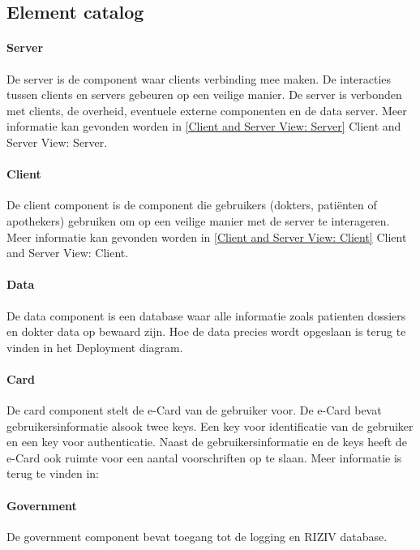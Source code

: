 \documentclass[a4paper,10pt]{paper}
\begin{document}
\subsection{Element catalog}

\paragraph{Server}
De server is de component waar clients verbinding mee maken.  De interacties tussen clients en servers gebeuren op een veilige manier.  De server is verbonden met clients, de overheid, eventuele externe componenten en de data server.  Meer informatie kan gevonden worden in \ref{Client and Server View: Server} Client and Server View: Server.

\paragraph{Client}
De client component is de component die gebruikers (dokters, pati\"{e}nten of apothekers) gebruiken om op een veilige manier met de server te interageren.  Meer informatie kan gevonden worden in \ref{Client and Server View: Client} Client and Server View: Client.

\paragraph{Data}
De data component is een database waar alle informatie zoals patienten dossiers en dokter data op bewaard zijn.  Hoe de data precies wordt opgeslaan is terug te vinden in het Deployment diagram.

\paragraph{Card}
De card component stelt de e-Card van de gebruiker voor.  De e-Card bevat gebruikersinformatie alsook twee keys.  Een key voor identificatie van de gebruiker en een key voor authenticatie.  Naast de gebruikersinformatie en de keys heeft de e-Card ook ruimte voor een aantal voorschriften op te slaan.  Meer informatie is terug te vinden in:

\paragraph{Government}
De government component bevat toegang tot de logging en RIZIV database.
\end{document}
